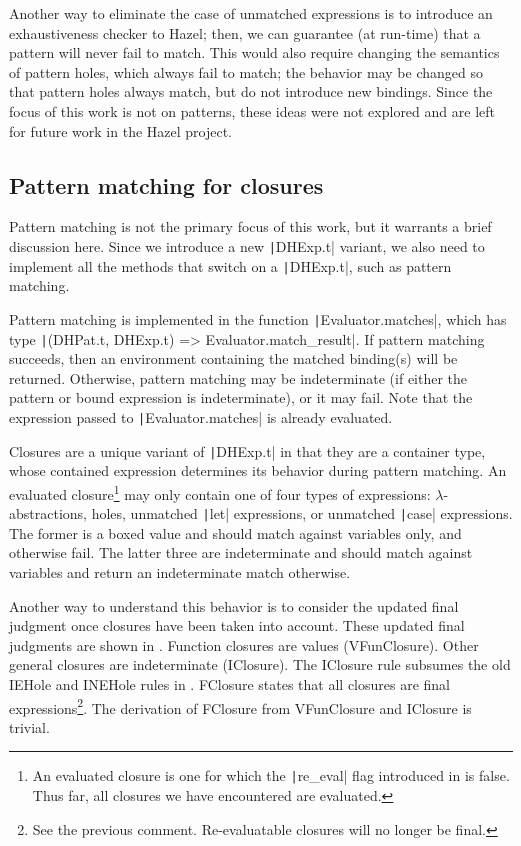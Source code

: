 Another way to eliminate the case of unmatched expressions is to introduce an exhaustiveness checker to Hazel; then, we can guarantee (at run-time) that a pattern will never fail to match. This would also require changing the semantics of pattern holes, which always fail to match; the behavior may be changed so that pattern holes always match, but do not introduce new bindings. Since the focus of this work is not on patterns, these ideas were not explored and are left for future work in the Hazel project.

\subsection{Pattern matching for closures}
\label{sec:generalized-closures-matching}

Pattern matching is not the primary focus of this work, but it warrants a brief discussion here. Since we introduce a new \texttt|DHExp.t| variant, we also need to implement all the methods that switch on a \texttt|DHExp.t|, such as pattern matching.

Pattern matching is implemented in the function \texttt|Evaluator.matches|, which has type \texttt|(DHPat.t, DHExp.t) => Evaluator.match_result|. If pattern matching succeeds, then an environment containing the matched binding(s) will be returned. Otherwise, pattern matching may be indeterminate (if either the pattern or bound expression is indeterminate), or it may fail. Note that the expression passed to \texttt|Evaluator.matches| is already evaluated.

Closures are a unique variant of \texttt|DHExp.t| in that they are a container type, whose contained expression determines its behavior during pattern matching. An evaluated closure\footnote{An evaluated closure is one for which the \texttt|re_eval| flag introduced in  is false. Thus far, all closures we have encountered are evaluated.} may only contain one of four types of expressions: $\lambda$-abstractions, holes, unmatched \texttt|let| expressions, or unmatched \texttt|case| expressions. The former is a boxed value and should match against variables only, and otherwise fail. The latter three are indeterminate and should match against variables and return an indeterminate match otherwise.

Another way to understand this behavior is to consider the updated \textsf{final} judgment once closures have been taken into account. These updated final judgments are shown in . Function closures are values (VFunClosure). Other general closures are indeterminate (IClosure). The IClosure rule subsumes the old IEHole and INEHole rules in . FClosure states that all closures are final expressions\footnote{See the previous comment. Re-evaluatable closures will no longer be final.}. The derivation of FClosure from VFunClosure and IClosure is trivial.

